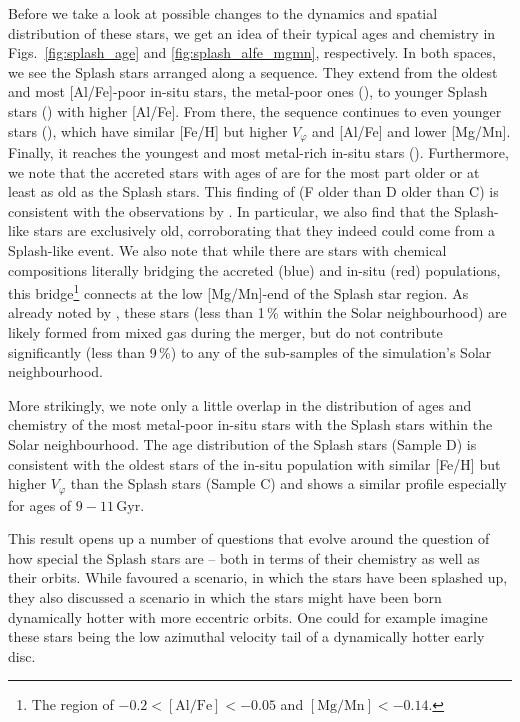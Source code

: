 \documentclass[fleqn,usenatbib]{mnras}
\begin{document}
Before we take a look at possible changes to the dynamics and spatial distribution of these stars, we get an idea of their typical ages and chemistry in Figs.~\ref{fig:splash_age} and \ref{fig:splash_alfe_mgmn}, respectively. In both spaces, we see the Splash stars arranged along a sequence. They extend from the oldest and most [Al/Fe]-poor in-situ stars, the metal-poor ones (), to younger Splash stars () with higher [Al/Fe]. From there, the sequence continues to even younger stars (), which have similar [Fe/H] but higher $V_\varphi$ and [Al/Fe] and lower [Mg/Mn]. Finally, it reaches the youngest and most metal-rich in-situ stars (). Furthermore, we note that the accreted stars with ages of  are for the most part older or at least as old as the Splash stars. This finding of (F older than D older than C) is consistent with the observations by \citet{Belokurov2020}. In particular, we also find that the Splash-like stars are exclusively old, corroborating that they indeed could come from a Splash-like event. We also note that while there are stars with chemical compositions literally bridging the accreted (blue) and in-situ (red) populations, this bridge\footnote{The region of $-0.2 < \mathrm{[Al/Fe]} < -0.05$ and $\mathrm{[Mg/Mn]} < -0.14$.} connects at the low [Mg/Mn]-end of the Splash star region. As already noted by \citet{Buder2024}, these stars  (less than 1\,\% within the Solar neighbourhood) are likely formed from mixed gas during the merger, but do not contribute significantly (less than 9\,\%) to any of the sub-samples of the simulation's Solar neighbourhood.

More strikingly, we note only a little overlap in the distribution of ages and chemistry of the most metal-poor in-situ stars with the Splash stars within the Solar neighbourhood. The age distribution of the Splash stars (Sample D) is consistent with the oldest stars of the in-situ population with similar [Fe/H] but higher $V_\varphi$ than the Splash stars (Sample C) and shows a similar profile especially for ages of $9-11\,\mathrm{Gyr}$.

This result opens up a number of questions that evolve around the question of how special the Splash stars are -- both in terms of their chemistry as well as their orbits. While \citet{Belokurov2020} favoured a scenario, in which the stars have been splashed up, they also discussed a scenario in which the stars might have been born dynamically hotter with more eccentric orbits. One could for example imagine these stars being the low azimuthal velocity tail of a dynamically hotter early disc.
\end{document}
